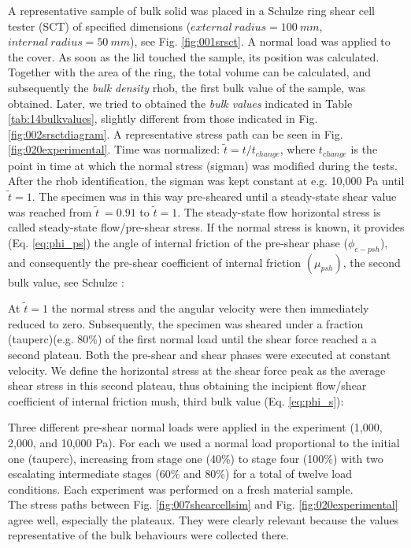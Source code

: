A representative sample of bulk solid was placed in a Schulze ring shear cell
tester (\acs{SCT}) of specified dimensions ($external ~ radius = 100 ~ mm$,
$internal ~ radius = 50 ~ mm$), see Fig. \ref{fig:001srsct}.
A normal load was applied to the cover. As soon as the lid touched the sample,
its position was calculated.
Together with the area of the ring, the total volume can be calculated, and subsequently the 
\textit{bulk density} \acs{rhob}, the first bulk value
of the sample, was obtained.
Later, we tried to obtained the \textit{bulk values} indicated in Table
\ref{tab:14bulkvalues}, slightly different from those indicated in Fig.
\ref{fig:002srsctdiagram}.
A representative stress path can be seen in Fig. \ref{fig:020experimental}.
Time was normalized: $\tilde{t} = t/t_{change}$, where $t_{change}$ is the
point in time at which the normal stress (\acs{sigman}) was modified during the	tests.
After the \acs{rhob} identification, the \acs{sigman} was kept constant at e.g.
10,000 Pa until $\tilde{t}=1$.
The specimen was in this way pre-sheared until a steady-state shear value was
reached from $\tilde{t}~=0.91$ to $\tilde{t}=1$.
The steady-state flow horizontal stress
is called steady-state flow/pre-shear stress.
If the normal stress is known, it provides (Eq. \ref{eq:phi_ps}) the angle of
internal friction of the pre-shear phase ($\phi_{e-psh}$), and consequently the
pre-shear coefficient of internal friction $ (\mu_{psh})$, the second
bulk value, see Schulze \cite{RefWorks:118}:

At $\tilde{t}=1$ the normal stress and the angular velocity were then
immediately reduced to zero.
Subsequently, the specimen was sheared under a fraction (\acs{tauperc})(e.g.
80\%) of the first normal load until the shear force reached a a second plateau.
Both the pre-shear and shear phases were executed at constant velocity. 
We define the horizontal stress at the shear force peak as the average shear
stress in this second plateau, thus obtaining the incipient flow/shear
coefficient of internal friction \acs{mush}, third bulk value (Eq. \ref{eq:phi_s})\cite{RefWorks:118}:

Three different pre-shear normal loads were applied in the experiment
(1,000, 2,000, and 10,000 Pa).
For each we used a normal load proportional to the initial one
(\acs{tauperc}), increasing from stage one (40\%) to stage four (100\%)
with two escalating intermediate stages (60\% and 80\%) for a total of twelve load conditions.
Each experiment was performed on a fresh material sample. \\

The stress paths between Fig. \ref{fig:007shearcellsim} and Fig.
\ref{fig:020experimental} agree well, especially the plateaux.
They were clearly relevant because
the values representative of the bulk behaviours were collected there.

